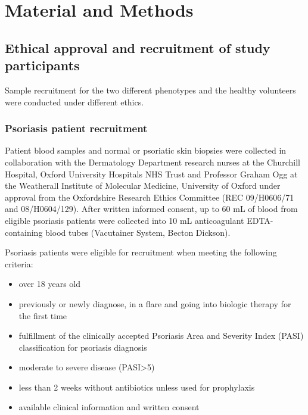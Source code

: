 \chapter{Material and Methods}
\label{ch:Mat}



\section{Ethical approval and recruitment of study participants}
Sample recruitment for the two different phenotypes and the healthy volunteers were conducted under different ethics.

\subsection{Psoriasis patient recruitment}

Patient blood samples and normal or psoriatic skin biopsies were collected in collaboration with the Dermatology Department research nurses at the Churchill Hospital, Oxford University Hospitals NHS Trust and Professor Graham Ogg at the Weatherall Institute of Molecular Medicine, University of Oxford under approval from the Oxfordshire Research Ethics Committee (REC 09/H0606/71 and 08/H0604/129). After written informed consent, up to 60 mL of blood from eligible psoriasis patients were collected into 10 mL anticoagulant EDTA-containing blood tubes (Vacutainer System, Becton Dickson).

Psoriasis patients were eligible for recruitment when meeting the following criteria:
\begin{itemize}
  \item over 18 years old
  \item previously or newly diagnose, in a flare and going into biologic therapy for the first time %
	\item fulfillment of the clinically accepted Psoriasis Area and Severity Index (PASI) classification for psoriasis diagnosis \parencite{Fredriksson1978}
	\item moderate to severe disease (PASI>5) %
	\item less than 2 weeks without antibiotics unless used for prophylaxis %
	\item available clinical information and written consent
\end{itemize}

